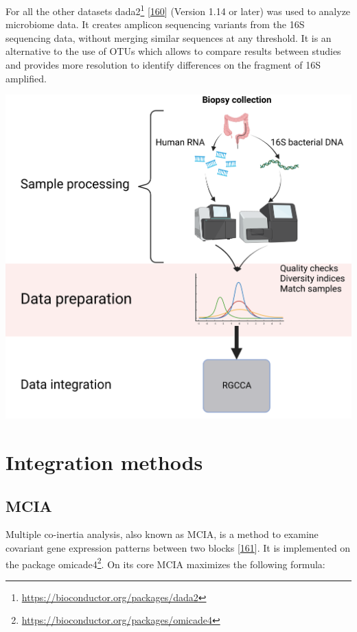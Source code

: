\documentclass[
  a4paper,
]{book}
\DeclareRobustCommand{\href}[2]{#2\footnote{\url{#1}}}
\let\origfigure\figure
\let\endorigfigure\endfigure
\renewenvironment{figure}[1][2] {
    \expandafter\origfigure\expandafter[!ht]
} {
    \endorigfigure
}
\begin{document}
For all the other datasets \href{https://bioconductor.org/packages/dada2}{dada2} {[}\protect\hyperlink{ref-callahan2016}{160}{]} (Version 1.14 or later) was used to analyze microbiome data.
It creates amplicon sequencing variants from the 16S sequencing data, without merging similar sequences at any threshold.
It is an alternative to the use of OTUs which allows to compare results between studies and provides more resolution to identify differences on the fragment of 16S amplified.

\begin{figure}
\includegraphics[width=1\linewidth]{images/workflow_integration2} \caption[Workflow of the analysis process.]{Workflow of the main analysis process of the thesis. Created with BioRender.com}\label{fig:workflow-process}
\end{figure}

\hypertarget{integration-methods}{%
\section{Integration methods}\label{integration-methods}}

\hypertarget{mcia}{%
\subsection{MCIA}\label{mcia}}

Multiple co-inertia analysis, also known as MCIA, is a method to examine covariant gene expression patterns between two blocks {[}\protect\hyperlink{ref-meng2014}{161}{]}.
It is implemented on the package \href{https://bioconductor.org/packages/omicade4}{omicade4}.
On its core MCIA maximizes the following formula:
\end{document}
